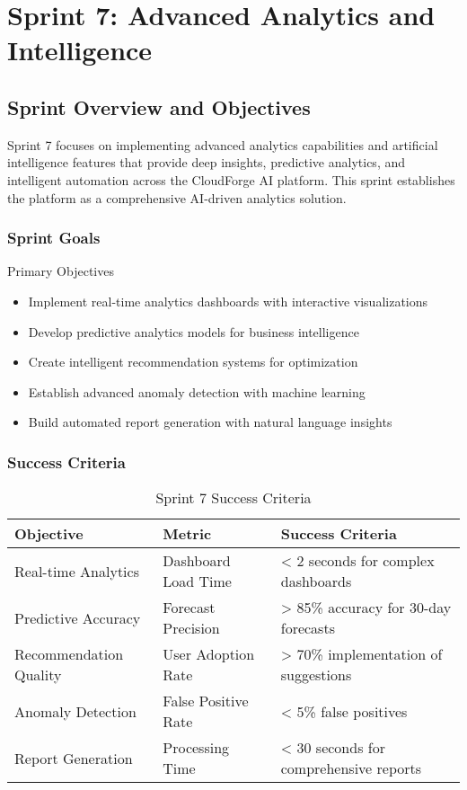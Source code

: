 \chapter{Sprint 7: Advanced Analytics and Intelligence}

\section{Sprint Overview and Objectives}

Sprint 7 focuses on implementing advanced analytics capabilities and artificial intelligence features that provide deep insights, predictive analytics, and intelligent automation across the CloudForge AI platform. This sprint establishes the platform as a comprehensive AI-driven analytics solution.

\subsection{Sprint Goals}

\begin{sprintbox}{Primary Objectives}
\begin{itemize}
    \item Implement real-time analytics dashboards with interactive visualizations
    \item Develop predictive analytics models for business intelligence
    \item Create intelligent recommendation systems for optimization
    \item Establish advanced anomaly detection with machine learning
    \item Build automated report generation with natural language insights
\end{itemize}
\end{sprintbox}

\subsection{Success Criteria}

\begin{table}[H]
\centering
\caption{Sprint 7 Success Criteria}
\begin{tabular}{|p{4cm}|p{3cm}|p{5cm}|}
\hline
\textbf{Objective} & \textbf{Metric} & \textbf{Success Criteria} \\
\hline
Real-time Analytics & Dashboard Load Time & < 2 seconds for complex dashboards \\
\hline
Predictive Accuracy & Forecast Precision & > 85\% accuracy for 30-day forecasts \\
\hline
Recommendation Quality & User Adoption Rate & > 70\% implementation of suggestions \\
\hline
Anomaly Detection & False Positive Rate & < 5\% false positives \\
\hline
Report Generation & Processing Time & < 30 seconds for comprehensive reports \\
\hline
\end{tabular}
\end{table}


